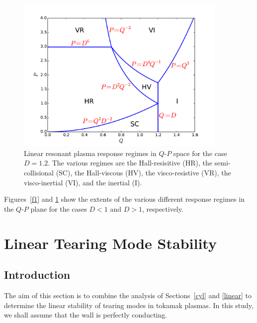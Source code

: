 \documentclass[notitlepage,12pt]{article}
\begin{document}
\begin{figure}
\centerline{\includegraphics[width=0.9\textwidth]{RegimeII.pdf}}
\caption{Linear resonant plasma response regimes in $Q$-$P$ space for the case $D=1.2$. The various regimes are
the Hall-resisitive (HR), the semi-collisional (SC), the Hall-viscous (HV), the visco-resistive (VR), the visco-inertial
(VI), and the inertial (I).}\label{f2}
\end{figure}

Figures~\ref{f1} and \ref{f2} show the extents of the various different response regimes in the $Q$-$P$ plane for the
cases $D<1$ and $D>1$, respectively. 

\section{Linear Tearing Mode Stability}
\subsection{Introduction}
The aim of this section is to combine the analysis of Sections~\ref{cyl} and \ref{linear} to determine the linear stability
of tearing modes in tokamak plasmas. In this study, we shall assume that the wall is perfectly conducting. 
\end{document}
